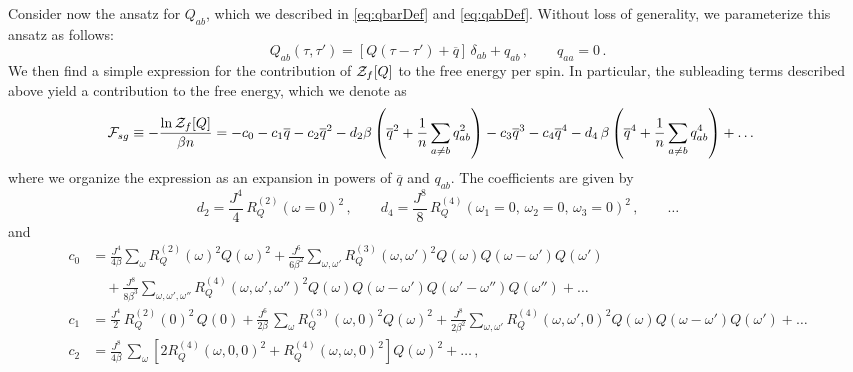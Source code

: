 \documentclass[aps,prx,preprint,onecolumn,citeautoscript,superscriptaddress,nofootinbib,
eqsecnum]{revtex4}
\begin{document}
{Consider now the ansatz for $Q_{ab}$, which we described in \eqref{eq:qbarDef} and \eqref{eq:qabDef}. Without loss of generality, we parameterize this ansatz as follows:
\begin{equation}
 Q_{ab}(\tau,\tau') = \left[ Q(\tau-\tau') + \overline{q} \right]\, \delta_{ab} + q_{ab} \,, \qquad q_{aa} =0 \,. \label{Qq}
\end{equation}
We then find a simple expression for the contribution of ${\cal Z}_f[Q]$ to the free energy per spin. In particular, the subleading terms described above yield a contribution to the free energy, which we denote as 
\begin{equation}
\label{eq:Fsg}
\begin{split}
 {\cal F}_{sg} \equiv  - \frac{\ln {\cal Z}_f[Q]}{\beta n} 
 &= -c_0 - c_{1}   \overline{q} 
 -
 c_{2} \overline{q}^2 - d_{2}  \beta \left( \overline{q}^2 +\frac{1}{n} \sum_{a\neq b} q_{ab}^2 \right) -
 c_{3} \overline{q}^3 -
 c_{4} \overline{q}^4 - d_{4} \, \beta \left( \overline{q}^4 + \frac{1}{n}\sum_{a\neq b} q_{ab}^4 \right) + \ldots 
\end{split}
\end{equation}
where we organize the expression as an expansion in powers of $\overline{q}$ and $q_{ab}$. The coefficients are given by
\begin{equation}
        d_{2} = \frac{J^4}{4} \, R_Q^{(2)}(\omega=0)^2 \,, \qquad
        d_{4} = \frac{J^8}{8} \, R_Q^{(4)}(\omega_1=0,\,\omega_2=0,\,\omega_3=0)^2 \,, \qquad \ldots 
 \end{equation}
 and
\begin{equation}
    \begin{split}
        c_0 &=  
        \frac{J^4}{4\beta} \sum_\omega R_Q^{(2)}(\omega)^2 Q(\omega)^2 + \frac{J^6}{6\beta^2} \sum_{\omega,\omega'} R_Q^{(3)}(\omega,\omega')^2 Q(\omega) Q(\omega-\omega') Q(\omega') \\
        &\quad + \frac{J^8}{8\beta^3} \sum_{\omega,\omega',\omega''} R_Q^{(4)}(\omega,\omega',\omega'')^2 Q(\omega) Q(\omega-\omega')Q(\omega'-\omega'') Q(\omega'') 
        + \ldots \, \\
        c_{1}  &= \frac{J^4}{2}\, R_Q^{(2)}(0)^2\, Q(0) + \frac{J^6}{2\beta} \, \sum_{\omega}  R_Q^{(3)} (\omega,0)^2 Q(\omega)^2 +\frac{J^8}{2\beta^2} \sum_{\omega,\omega'} R_Q^{(4)}(\omega,\omega',0)^2Q(\omega)Q(\omega-\omega')Q(\omega')+ \ldots \\
        c_{2} &= 
        \frac{J^8}{4\beta}\, \sum_{\omega}  \left[ 2 R_Q^{(4)} (\omega,0,0)^2 + R_Q^{(4)} (\omega,\omega,0)^2 \right] Q(\omega)^2 + \ldots \,,\\

\end{split}
\end{equation}}
\end{document}
